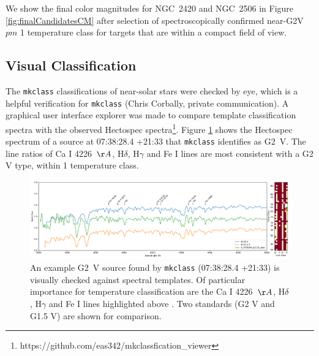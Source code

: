 \documentclass{aastex6}
\begin{document}
We show the final color magnitudes for NGC~2420 and NGC~2506 in Figure \ref{fig:finalCandidatesCM} after selection of spectroscopically confirmed near-G2V $pm$ 1 temperature class for targets that are within a compact field of view.

\subsection{Visual Classification}

The \texttt{mkclass} classifications of near-solar stars were checked by eye, which is a helpful verification for \texttt{mkclass} (Chris Corbally, private communication).
A graphical user interface explorer was made to compare template classification spectra with the observed Hectospec spectra\footnote{https://github.com/eas342/mkclassfication\_viewer}.
Figure \ref{fig:0738284p2133class} shows the Hectospec spectrum of a source at 07:38:28.4 +21:33 that \texttt{mkclass} identifies as G2~V.
The line ratios of Ca I 4226~$\AA$, H$\delta$, H$\gamma$ and Fe I lines are most consistent with a G2 V type, within 1 temperature class.

\begin{figure}[!hbtp]
\centering
\includegraphics[width=.95\columnwidth]{O_0738284_p2133_class_g2v.pdf}
\caption{An example G2~V source found by \texttt{mkclass} (07:38:28.4 +21:33) is visually checked against spectral templates.
Of particular importance for temperature classification are the Ca I 4226~$\AA$, H$\delta$, H$\gamma$ and Fe I lines highlighted above \citep{gray2009specClass}.
Two standards (G2 V and G1.5 V) are shown for comparison.}\label{fig:0738284p2133class}
\end{figure}
\end{document}
